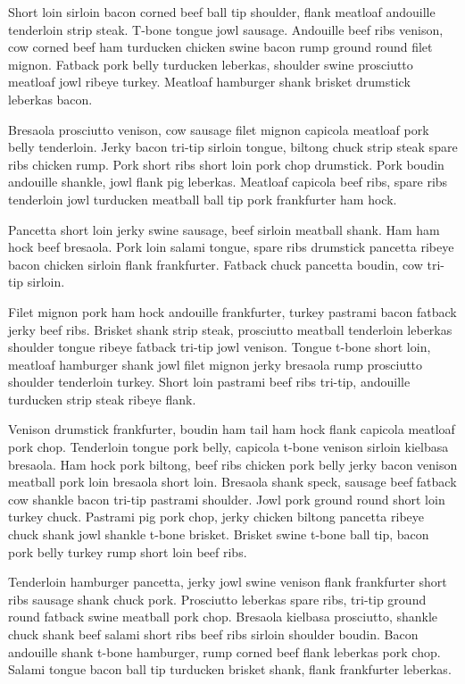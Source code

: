 Short loin sirloin bacon corned beef ball tip shoulder, flank meatloaf andouille tenderloin strip steak. T-bone tongue jowl sausage. Andouille beef ribs venison, cow corned beef ham turducken chicken swine bacon rump ground round filet mignon. Fatback pork belly turducken leberkas, shoulder swine prosciutto meatloaf jowl ribeye turkey. Meatloaf hamburger shank brisket drumstick leberkas bacon.

Bresaola prosciutto venison, cow sausage filet mignon capicola meatloaf pork belly tenderloin. Jerky bacon tri-tip sirloin tongue, biltong chuck strip steak spare ribs chicken rump. Pork short ribs short loin pork chop drumstick. Pork boudin andouille shankle, jowl flank pig leberkas. Meatloaf capicola beef ribs, spare ribs tenderloin jowl turducken meatball ball tip pork frankfurter ham hock.

Pancetta short loin jerky swine sausage, beef sirloin meatball shank. Ham ham hock beef bresaola. Pork loin salami tongue, spare ribs drumstick pancetta ribeye bacon chicken sirloin flank frankfurter. Fatback chuck pancetta boudin, cow tri-tip sirloin.

Filet mignon pork ham hock andouille frankfurter, turkey pastrami bacon fatback jerky beef ribs. Brisket shank strip steak, prosciutto meatball tenderloin leberkas shoulder tongue ribeye fatback tri-tip jowl venison. Tongue t-bone short loin, meatloaf hamburger shank jowl filet mignon jerky bresaola rump prosciutto shoulder tenderloin turkey. Short loin pastrami beef ribs tri-tip, andouille turducken strip steak ribeye flank.

Venison drumstick frankfurter, boudin ham tail ham hock flank capicola meatloaf pork chop. Tenderloin tongue pork belly, capicola t-bone venison sirloin kielbasa bresaola. Ham hock pork biltong, beef ribs chicken pork belly jerky bacon venison meatball pork loin bresaola short loin. Bresaola shank speck, sausage beef fatback cow shankle bacon tri-tip pastrami shoulder. Jowl pork ground round short loin turkey chuck. Pastrami pig pork chop, jerky chicken biltong pancetta ribeye chuck shank jowl shankle t-bone brisket. Brisket swine t-bone ball tip, bacon pork belly turkey rump short loin beef ribs.

Tenderloin hamburger pancetta, jerky jowl swine venison flank frankfurter short ribs sausage shank chuck pork. Prosciutto leberkas spare ribs, tri-tip ground round fatback swine meatball pork chop. Bresaola kielbasa prosciutto, shankle chuck shank beef salami short ribs beef ribs sirloin shoulder boudin. Bacon andouille shank t-bone hamburger, rump corned beef flank leberkas pork chop. Salami tongue bacon ball tip turducken brisket shank, flank frankfurter leberkas.

